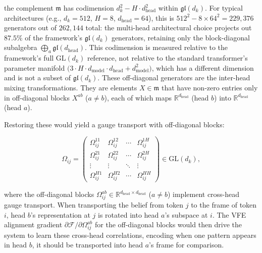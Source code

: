 \documentclass[twoside,11pt]{article}
\begin{document}
the complement $\mathfrak{m}$ has codimension $d_k^2 - H \cdot d_{\text{head}}^2$ within $\mathfrak{gl}(d_k)$. For typical architectures (e.g., $d_k = 512$, $H = 8$, $d_{\text{head}} = 64$), this is $512^2 - 8 \times 64^2 = 229{,}376$ generators out of $262{,}144$ total: the multi-head architectural choice projects out $87.5\%$ of the framework's $\mathfrak{gl}(d_k)$ generators, retaining only the block-diagonal subalgebra $\bigoplus_a \mathfrak{gl}(d_{\text{head}})$. This codimension is measured relative to the framework's full $\mathrm{GL}(d_k)$ reference, not relative to the standard transformer's parameter manifold $\big(3 \cdot H \cdot d_{\text{model}} \cdot d_{\text{head}} + d_{\text{model}}^2\big)$, which has a different dimension and is not a subset of $\mathfrak{gl}(d_k)$. These off-diagonal generators are the inter-head mixing transformations. They are elements $X \in \mathfrak{m}$ that have non-zero entries only in off-diagonal blocks $X^{ab}$ ($a \neq b$), each of which maps $\mathbb{R}^{d_{\text{head}}}$ (head $b$) into $\mathbb{R}^{d_{\text{head}}}$ (head $a$).

Restoring these would yield a gauge transport with off-diagonal blocks:

\begin{equation}
\Omega_{ij} = \begin{pmatrix}
\Omega_{ij}^{11} & \Omega_{ij}^{12} & \cdots & \Omega_{ij}^{1H} \\
\Omega_{ij}^{21} & \Omega_{ij}^{22} & \cdots & \Omega_{ij}^{2H} \\
\vdots & \vdots & \ddots & \vdots \\
\Omega_{ij}^{H1} & \Omega_{ij}^{H2} & \cdots & \Omega_{ij}^{HH}
\end{pmatrix} \in \mathrm{GL}(d_k),
\label{eq:full_gauge_transport}
\end{equation}

where the off-diagonal blocks $\Omega_{ij}^{ab} \in \mathbb{R}^{d_{\text{head}} \times d_{\text{head}}}$ ($a \neq b$) implement cross-head gauge transport. When transporting the belief from token $j$ to the frame of token $i$, head $b$'s representation at $j$ is rotated into head $a$'s subspace at $i$. The VFE alignment gradient $\partial \mathcal{F}/\partial \Omega_{ij}^{ab}$ for the off-diagonal blocks would then drive the system to learn these cross-head correlations, encoding when one pattern appears in head $b$, it should be transported into head $a$'s frame for comparison.
\end{document}
